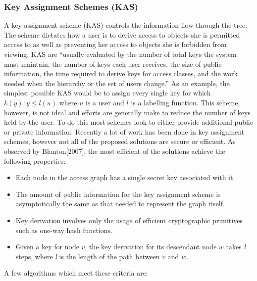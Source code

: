 \documentclass[12pt, titlepage]{article}
\begin{document}
\subsubsection{Key Assignment Schemes (KAS)}
A key assignment scheme (KAS) controls the information flow through the tree. The scheme dictates how a user is to derive access to objects she is permitted access to as well as preventing her access to objects she is forbidden from viewing. KAS are ``usually evaluated by the number of total keys the system must maintain, the number of keys each user receives, the size of public information, the time required to derive keys for access classes, and the work needed when the hierarchy or the set of users change.''\cite{atallah2005} As an example, the simplest possible KAS would be to assign every single key for which $k(y) : y\le l(u)$ where $u$ is a user and $l$ is a labelling function. This scheme, however, is not ideal and efforts are generally make to reduce the number of keys held by the user. To do this most schemes look to either provide additional public or private information. 
\newline \indent Recently a lot of work has been done in key assignment schemes, however not all of the proposed solutions are secure or efficient. As observed by Blanton[2007], the most efficient of the solutions achieve the following properties:\cite{blanton2007}
\begin{itemize}
\item Each node in the access graph has a single secret key associated with it.
\item The amount of public information for the key assignment scheme is asymptotically the same as that needed to represent the graph itself.
\item Key derivation involves only the usage of efficient cryptographic primitives such
as one-way hash functions.
\item Given a key for node $v$, the key derivation for its descendant node $w$ takes \textit{l} steps, where \textit{l} is the length of the path between $v$ and $w$.
\end{itemize}
 A few algorithms which meet these criteria are:
\end{document}
